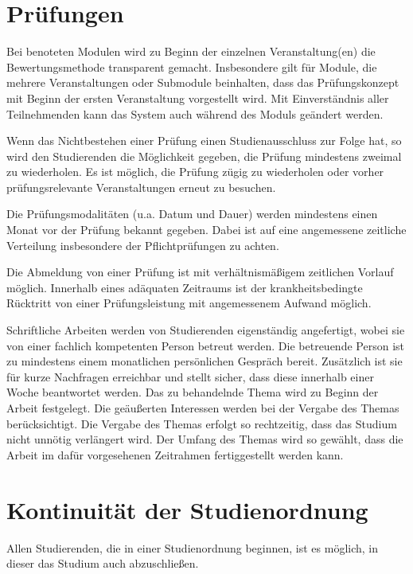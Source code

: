 \section{Prüfungen}

Bei benoteten Modulen wird zu Beginn der einzelnen Veranstaltung(en) die Bewertungsmethode transparent gemacht. Insbesondere gilt für Module, die mehrere Veranstaltungen oder Submodule beinhalten, dass das Prüfungskonzept mit Beginn der ersten Veranstaltung vorgestellt wird. Mit Einverständnis aller Teilnehmenden kann das System auch während des Moduls geändert werden.

Wenn das Nichtbestehen einer Prüfung einen Studienausschluss zur Folge hat, so wird den Studierenden die Möglichkeit gegeben, die Prüfung mindestens zweimal zu wiederholen. Es ist möglich, die Prüfung zügig zu wiederholen oder vorher prüfungsrelevante Veranstaltungen erneut zu besuchen.

Die Prüfungsmodalitäten (u.a. Datum und Dauer) werden mindestens einen Monat vor der Prüfung bekannt gegeben. Dabei ist auf eine angemessene zeitliche Verteilung insbesondere der Pflichtprüfungen zu achten.

Die Abmeldung von einer Prüfung ist mit verhältnismäßigem zeitlichen Vorlauf möglich. Innerhalb eines adäquaten Zeitraums ist der krankheitsbedingte Rücktritt von einer Prüfungsleistung mit angemessenem Aufwand möglich.

Schriftliche Arbeiten werden von Studierenden eigenständig angefertigt, wobei sie von einer fachlich kompetenten Person betreut werden. Die betreuende Person ist zu mindestens einem monatlichen persönlichen Gespräch bereit. Zusätzlich ist sie für kurze Nachfragen erreichbar und stellt sicher, dass diese innerhalb einer Woche beantwortet werden. Das zu behandelnde Thema wird zu Beginn der Arbeit festgelegt. Die geäußerten Interessen werden bei der Vergabe des Themas berücksichtigt. Die Vergabe des Themas erfolgt so rechtzeitig, dass das Studium nicht unnötig verlängert wird. Der Umfang des Themas wird so gewählt, dass die Arbeit im dafür vorgesehenen Zeitrahmen fertiggestellt werden kann.

\section{Kontinuität der Studienordnung}

Allen Studierenden, die in einer Studienordnung beginnen, ist es möglich, in dieser das Studium auch abzuschließen.

